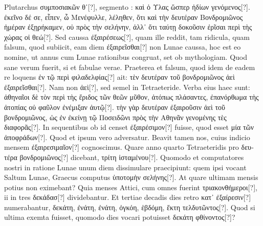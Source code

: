 Plutarchus \textgreek{συμποσιακῶν θ᾽[?]}, segmento
: \textgreek{καὶ ὁ Υλας ὥσπερ ἡδίων γενόμενος[?]}.
\textgreek{ἐκεῖνο δέ σε, εἶπεν, ὦ Μενέφυλλε,
λέληθεν, ὅτι καὶ τὴν δευτέραν Βονδρομιῶνος ἡμέραν ἐξῃρήκαμεν, οὐ πρὸς τὴν
σελήνην, ἀλλ᾽ ὅτι ταύτῃ δοκοῦσιν ἐρῖσαι περὶ τὴς χώρας οἱ θεώ[?]}.
Sed caussa
\textgreek{ἐξαιρέσεως[?]}, quam ille reddit, tam ridicula, quam falsum,
 quod subiicit,
eam diem \textgreek{ἐξαιρεῖσθαι[?]} non Lunae caussa, hoc est eo nomine, ut
annus cum Lunae rationibus congruat, set ob mythologiam.
Quod
sane verum fuerit, si et fabulae verae.
Praeterea et falsum, quod idem
de eadem re loquens \textgreek{ἐν τῷ περὶ φιλαδελφίας[?]} ait:
 \textgreek{τὲν δευτέραν τοῦ βονδρομιῶνος
ἀεὶ ἐξαιρεῖσθαι[?]}.
Nam non \textgreek{ἀεὶ[?]}, sed semel in Tetraeteride.
Verba eius
haec sunt: \textgreek{ἀθηναῖοι δὲ τὸν περὶ τὴς ἔριδος τῶν θεῶν μῦθον,
 ἀτόπως πλάσαντες,
ἐπανόρθωμα τὴς ἀτοπίας οὐ φαῦλον ἐνέμιξαν ἀυτῷ[?]}.
\textgreek{τὴν γὰρ δευτέραν ἐξαιροῦσιν
ἀεὶ τοῦ βονδρομιῶνος, ὡς ἐν ἐκείνῃ τῷ Ποσειδῶνι πρὸς τὴν Αθηνᾶν γενομένης τὲς
διαφορᾶς[?]}.
In sequentibus ob id censet \textgreek{ἐξαιρέσιμον[?]} fuisse,
 quod esset \textgreek{μία
τῶν ἀποφράδων[?]}.
Quod et ipsum vero adversatur.
Beavit tamen nos, cuius
indicio mensem \textgreek{ἐξαιρεσιμαῖον[?]} cognoscimus.
Quare anno quarto
Tetraeteridis pro \textgreek{δευτέρα βονδρομιῶνος[?]} dicebant,
 \textgreek{τρίτη ἱσταμένου[?]}.
Quomodo
et computatores nostri in ratione Lunae unum diem dissimulare
praecipiunt: quem ipsi vocant Saltum Lunae,
 Graecus computus \textgreek{ὑποτομὴν
σελήνης[?]}.
At quare ultimam mensis potius non eximebant?
Quia
menses Attici, cum omnes fuerint \textgreek{τριακονθήμεροι[?]},
 ii in tres \textgreek{δεκάδασ[?]} dividebantur.
%
Et tertiae decadis dies retro \textgreek{κατ᾽ ἐξαίρεσιν[?]}
 numerabantur, \textgreek{δεκάτη,
ἐνάτη, ἐνάτη, ὀγκόη, ἑβδόμη, ἕκτη τελδυτῶντος[?]}.
Quod si ultima exemta fuisset,
quomodo  dies vocari potuisset \textgreek{δεκάτη φθίνοντος[?]}?
